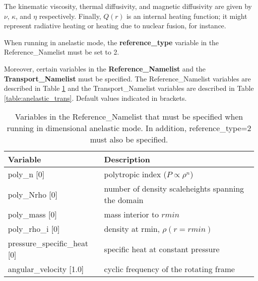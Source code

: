 The kinematic viscosity, thermal diffusivity, and magnetic diffusivity are given by $\nu$, $\kappa$, and $\eta$ respectively.  Finally, $Q(r)$ is an internal heating function; it might represent radiative heating or heating due to nuclear fusion, for instance.


When running in anelastic mode, the \textbf{reference\_type} variable in the Reference\_Namelist must be set to 2.

Moreover, certain variables in the \textbf{Reference\_Namelist} and the \textbf{Transport\_Namelist} must be specified.  The Reference\_Namelist variables are described in Table \ref{table:anelastic} and the Transport\_Namelist variables are described in Table \ref{table:anelastic_trans}. Default values indicated in brackets.

\begin{table}
\centering
\begin{tabular}{| l | l |}
\hline
Variable & Description \\
\hline
poly\_n [0]                  & polytropic index ($P\propto\rho^n$) \\
poly\_Nrho [0]               & number of density scaleheights spanning the domain \\
poly\_mass [0]               & mass interior to $rmin$ \\
poly\_rho\_i [0]             & density at rmin, $\rho(r=rmin)$ \\
pressure\_specific\_heat [0] & specific heat at constant pressure \\
angular\_velocity [1.0]      & cyclic frequency of the rotating frame \\
\hline
\end{tabular}
\caption{\label{table:anelastic} Variables in the Reference\_Namelist that must be specified when running in dimensional anelastic mode. In addition, reference\_type=2 must also be specified.}
\end{table}

